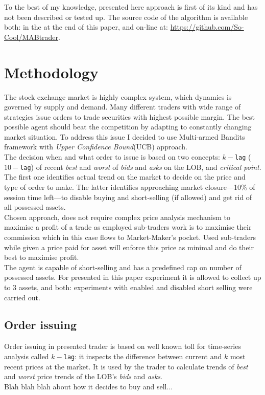 \documentclass{llncs}
\begin{document}
To the best of my knowledge, presented here approach is first of its kind and has not been described or tested up. The source code of the algorithm is available both: in the \emph{\appendixname} at the end of this paper, and on-line at: \url{https://github.com/So-Cool/MABtrader}.\\

\section{Methodology}
The stock exchange market is highly complex system, which dynamics is governed by supply and demand. Many different traders with wide range of strategies issue orders to trade securities with highest possible margin. The best possible agent should beat the competition by adapting to constantly changing market situation. To address this issue I decided to use Multi-armed Bandits framework with \emph{Upper Confidence Bound}(UCB) approach.\\

The decision when and what order to issue is based on two concepts: $k-$\texttt{lag} ($10-$\texttt{lag}) of recent \emph{best} and \emph{worst} of \emph{bids} and \emph{asks} on the LOB, and \emph{critical point}. The first one identifies actual trend on the market to decide on the price and type of order to make. The latter identifies approaching market closure---10\% of session time left---to disable buying and short-selling (if allowed) and get rid of all possessed assets.\\
Chosen approach, does not require complex price analysis mechanism to maximise a profit of a trade as employed sub-traders work is to maximise their commission which in this case flows to Market-Maker's pocket. Used sub-traders while given a price paid for asset will enforce this price as minimal and do their best to maximise profit.\\
The agent is capable of short-selling and has a predefined cap on number of possessed assets. For presented in this paper experiment it is allowed to collect up to $3$ assets, and both: experiments with enabled and disabled short selling were carried out.\\

\subsection{Order issuing}
Order issuing in presented trader is based on well known toll for time-series analysis called $k-$\texttt{lag}: it inspects the difference between current and $k$ most recent prices at the market. It is used by the trader to calculate trends of \emph{best} and \emph{worst} price trends of the LOB's \emph{bids} and \emph{asks}.\\
Blah blah blah about how it decides to buy and sell...\\
\end{document}
